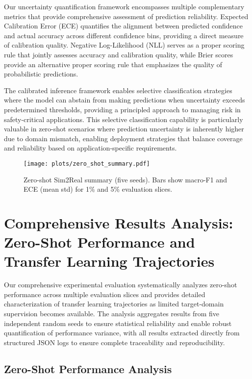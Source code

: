 \documentclass[journal]{IEEEtran}
\begin{document}
Our uncertainty quantification framework encompasses multiple complementary metrics that provide comprehensive assessment of prediction reliability. Expected Calibration Error (ECE) quantifies the alignment between predicted confidence and actual accuracy across different confidence bins, providing a direct measure of calibration quality. Negative Log-Likelihood (NLL) serves as a proper scoring rule that jointly assesses accuracy and calibration quality, while Brier scores provide an alternative proper scoring rule that emphasizes the quality of probabilistic predictions.

The calibrated inference framework enables selective classification strategies where the model can abstain from making predictions when uncertainty exceeds predetermined thresholds, providing a principled approach to managing risk in safety-critical applications. This selective classification capability is particularly valuable in zero-shot scenarios where prediction uncertainty is inherently higher due to domain mismatch, enabling deployment strategies that balance coverage and reliability based on application-specific requirements.

\begin{figure}[t]
\centering
\texttt{[image: plots/zero\_shot\_summary.pdf]}
\caption{Zero-shot Sim2Real summary (five seeds). Bars show macro-F1 and ECE (mean\,\textpm\,std) for 1\% and 5\% evaluation slices.}
\label{fig:zs_summary}
\end{figure}

\section{Comprehensive Results Analysis: Zero-Shot Performance and Transfer Learning Trajectories}

Our comprehensive experimental evaluation systematically analyzes zero-shot performance across multiple evaluation slices and provides detailed characterization of transfer learning trajectories as limited target-domain supervision becomes available. The analysis aggregates results from five independent random seeds to ensure statistical reliability and enable robust quantification of performance variance, with all results extracted directly from structured JSON logs to ensure complete traceability and reproducibility.

\subsection{Zero-Shot Performance Analysis}
\end{document}
